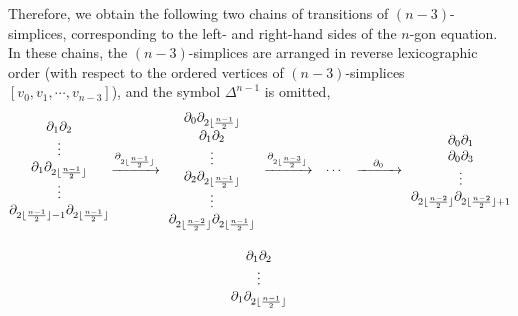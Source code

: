 \documentclass[pdftex]{sigma}
\numberwithin{equation}{section}
\theoremstyle{definition}
\begin{document}
Therefore, we obtain the following two chains of transitions of $(n-3)$-simplices, corresponding to the left- and right-hand sides of the $n$-gon equation.
In these chains, the $(n-3)$-simplices are arranged in reverse lexicographic order (with respect to the ordered vertices of $(n-3)$-simplices $[v_0,v_1,\cdots, v_{n-3}]$), and the symbol $\Delta^{n-1}$ is omitted,
\begin{gather*}
 \begin{array}{@{}c@{\,}c@{\,}c@{\,}ccc@{\,}c@{}}
 \begin{array}{@{}c@{}}
 \partial_1\partial_2\\
 \vdots\\
 \partial_1\partial_{2\lfloor\frac{n-1}{2}\rfloor}\\
 \vdots\\
 \partial_{2\lfloor\frac{n-1}{2}\rfloor-1}\partial_{2\lfloor\frac{n-1}{2}\rfloor}\\
 \end{array}
 &
 \xrightarrow{\partial_{2\lfloor\frac{n-1}{2}\rfloor}}
 &
 \begin{array}{c}
 \partial_0\partial_{2\lfloor\frac{n-1}{2}\rfloor}\\
 \partial_1\partial_2\\
 \vdots\\
 \partial_2\partial_{2\lfloor\frac{n-1}{2}\rfloor}\\
 \vdots\\
 \partial_{2\lfloor\frac{n-2}{2}\rfloor}\partial_{2\lfloor\frac{n-1}{2}\rfloor}
 \end{array}
 &
 \xrightarrow{\partial_{2\lfloor\frac{n-3}{2}\rfloor}}
 &
 \cdots
 &
 \xrightarrow{\quad\partial_0\quad}
 &
 \begin{array}{c@{}}
 \partial_0\partial_1\\
 \partial_0\partial_3\\
 \vdots\\
 \partial_{2\lfloor\frac{n-2}{2}\rfloor}\partial_{2\lfloor\frac{n-2}{2}\rfloor+1}
 \end{array}
 \end{array}\\[10pt]
 \begin{array}{@{}c@{\,}c@{\,}c@{\,}ccc@{\,}c@{}}
 \begin{array}{@{}c@{}}
 \partial_1\partial_2\\
 \vdots\\
 \partial_1\partial_{2\lfloor\frac{n-1}{2}\rfloor}\\

\end{array}
\end{array}
\end{gather*}
\end{document}

